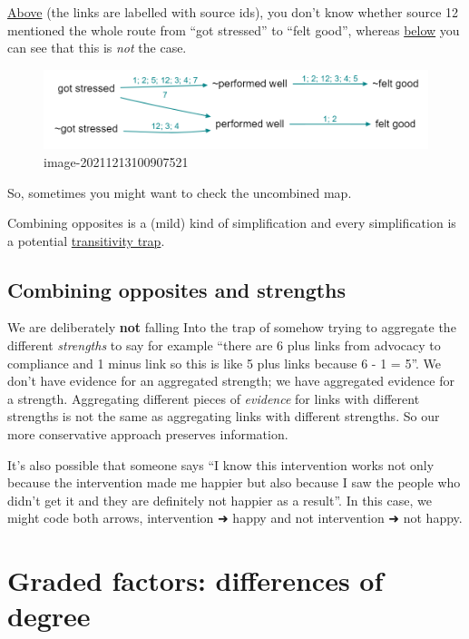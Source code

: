 \documentclass[
]{book}
\begin{document}
\href{causalmap.shinyapps.io/CM2test/?s=364}{Above} (the links are labelled with source ids), you don't know whether source 12 mentioned the whole route from ``got stressed'' to ``felt good'', whereas \href{causalmap.shinyapps.io/CM2test/?s=365}{below} you can see that this is \emph{not} the case.

\begin{figure}
\centering
\includegraphics{_assets/image-20211213100907521.png}
\caption{image-20211213100907521}
\end{figure}

So, sometimes you might want to check the uncombined map.

Combining opposites is a (mild) kind of simplification and every simplification is a potential \protect\hyperlink{xtransitivity-trap}{transitivity trap}.

\hypertarget{combining-opposites-and-strengths-1}{%
\subsection{Combining opposites and strengths}\label{combining-opposites-and-strengths-1}}

We are deliberately \textbf{not} falling Into the trap of somehow trying to aggregate the different \emph{strengths} to say for example ``there are 6 plus links from advocacy to compliance and 1 minus link so this is like 5 plus links because 6 - 1 = 5''. We don't have evidence for an aggregated strength; we have aggregated evidence for a strength. Aggregating different pieces of \emph{evidence} for links with different strengths is not the same as aggregating links with different strengths. So our more conservative approach preserves information.

It's also possible that someone says ``I know this intervention works not only because the intervention made me happier but also because I saw the people who didn't get it and they are definitely not happier as a result''. In this case, we might code both arrows, intervention ➜ happy and not intervention ➜ not happy.

\hypertarget{graded-factors-differences-of-degree}{%
\section{Graded factors: differences of degree}\label{graded-factors-differences-of-degree}}
\end{document}
